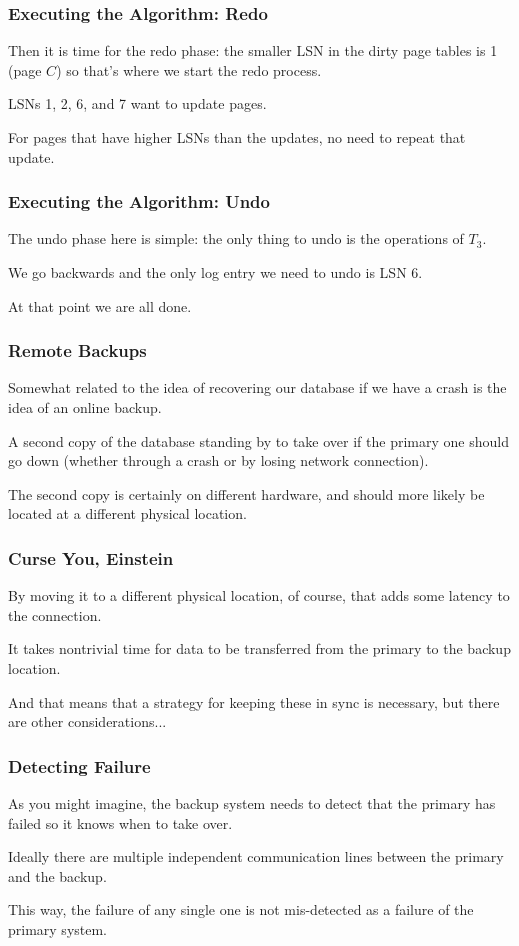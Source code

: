 \begin{frame}
\frametitle{Executing the Algorithm: Redo}

Then it is time for the redo phase: the smaller LSN in the dirty page tables is 1 (page $C$) so that's where we start the redo process. 

LSNs 1, 2, 6, and 7 want to update pages. 

For pages that have higher LSNs than the updates, no need to repeat that update.


\end{frame}


\begin{frame}
\frametitle{Executing the Algorithm: Undo}

The undo phase here is simple: the only thing to undo is the operations of $T_{3}$. 

We go backwards and the only log entry we need to undo is LSN 6. 

At that point we are all done.


\end{frame}


\begin{frame}
\frametitle{Remote Backups}

Somewhat related to the idea of recovering our database if we have a crash is the idea of an online backup. 

A second copy of the database standing by to take over if the primary one should go down (whether through a crash or by losing network connection). 

The second copy is certainly on different hardware, and should more likely be located at a different physical location. 

\end{frame}


\begin{frame}
\frametitle{Curse You, Einstein}

By moving it to a different physical location, of course, that adds some latency to the connection. 

It takes nontrivial time for data to be transferred from the primary to the backup location. 

And that means that a strategy for keeping these in sync is necessary, but there are other considerations...

\end{frame}


\begin{frame}
\frametitle{Detecting Failure}

 As you might imagine, the backup system needs to detect that the primary has failed so it knows when to take over. 
 
 Ideally there are multiple independent communication lines between the primary and the backup.
 
This way, the failure of any single one is not mis-detected as a failure of the primary system.

\end{frame}


